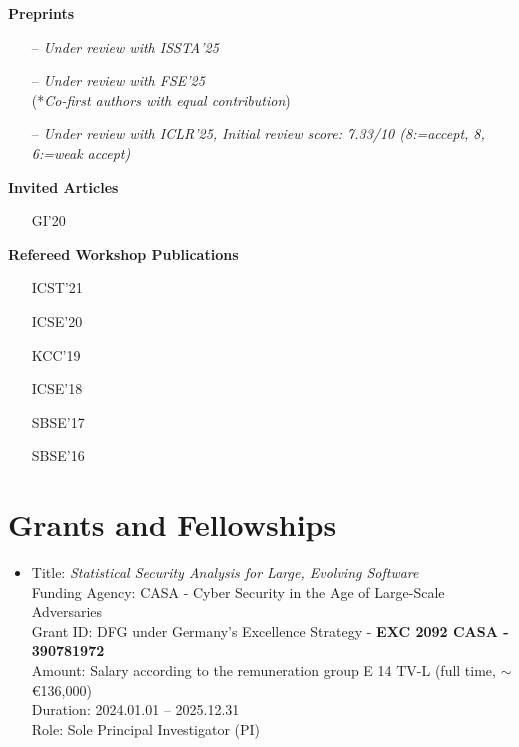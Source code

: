 \documentclass[letterpaper,11pt]{article}
\begin{document}

\textbf{Preprints}\vspace{-4pt}
\begin{itemize}[leftmargin=2cm]
  \item[]  -- \emph{Under review with ISSTA'25}
  \item[]  -- \emph{Under review with FSE'25} \\ (*\emph{Co-first authors with equal contribution})
  \item[]  -- \emph{Under review with ICLR'25, Initial review score: 7.33/10 (8:=accept, 8, 6:=weak accept)}
\end{itemize}

\textbf{Invited Articles}\vspace{-4pt}
\begin{itemize}[leftmargin=2cm]
  \item[GI'20] 
\end{itemize}

\textbf{Refereed Workshop Publications}\vspace{-4pt}
\begin{itemize}[leftmargin=2cm]
  \item[ICST'21] 
  \item[ICSE'20] 
  \item[KCC'19] 
  \item[ICSE'18] 
  \item[SBSE'17] 
  \item[SBSE'16] 
\end{itemize}

\section{Grants and Fellowships}
\begin{itemize}
  \item Title: \emph{Statistical Security Analysis for Large, Evolving Software} \\
        Funding Agency: CASA - Cyber Security in the Age of Large-Scale Adversaries \\
        Grant ID: DFG under Germany's Excellence Strategy - \textbf{EXC 2092 CASA - 390781972} \\
        Amount: Salary according to the remuneration group E 14 TV-L (full time, $\sim$ \euro{136,000}) \\
        Duration: 2024.01.01 -- 2025.12.31 \\
        Role: Sole Principal Investigator (PI)
\end{itemize}
\end{document}
